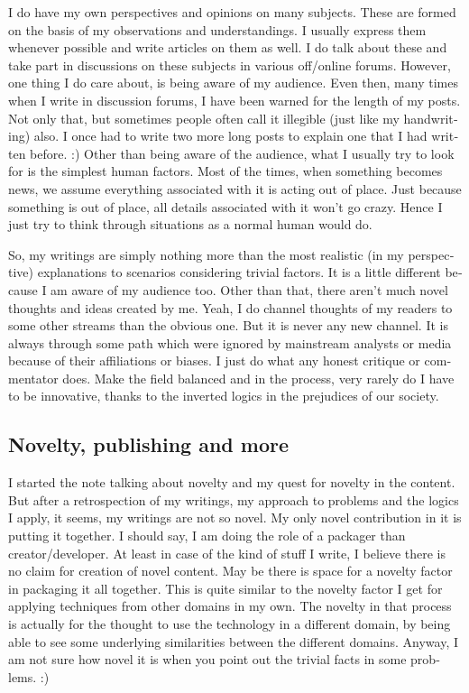 \begin{english}
I do have my own perspectives and opinions on many subjects. These are formed on the basis of my observations and understandings. I usually express them whenever possible and write articles on them as well. I do talk about these and take part in discussions on these subjects in various off/online forums. However, one thing I do care about, is being aware of my audience. Even then, many times when I write in discussion forums, I have been warned for the length of my posts. Not only that, but sometimes people often call it illegible (just like my handwriting) also. I once had to write two more long posts to explain one that I had written before. :) Other than being aware of the audience, what I usually try to look for is the simplest human factors. Most of the times, when something becomes news, we assume everything associated with it is acting out of place. Just because something is out of place, all details associated with it won't go crazy. Hence I just try to think through situations as a normal human would do.

So, my writings are simply nothing more than the most realistic (in my perspective) explanations to scenarios considering trivial factors. It is a little different because I am aware of my audience too. Other than that, there aren't much novel thoughts and ideas created by me. Yeah, I do channel thoughts of my readers to some other streams than the obvious one. But it is never any new channel. It is always through some path which were ignored by mainstream analysts or media because of their affiliations or biases. I just do what any honest critique or commentator does. Make the field balanced and in the process, very rarely do I have to be innovative, thanks to the inverted logics in the prejudices of our society.

\subsection*{Novelty, publishing and more}

I started the note talking about novelty and my quest for novelty in the content. But after a retrospection of my writings, my approach to problems and the logics I apply, it seems, my writings are not so novel. My only novel contribution in it is putting it together. I should say, I am doing the role of a packager than creator/developer. At least in case of the kind of stuff I write, I believe there is no claim for creation of novel content. May be there is space for a novelty factor in packaging it all together. This is quite similar to the novelty factor I get for applying techniques from other domains in my own. The novelty in that process is actually for the thought to use the technology in a different domain, by being able to see some underlying similarities between the different domains. Anyway, I am not sure how novel it is when you point out the trivial facts in some problems. :) 


\end{english}
